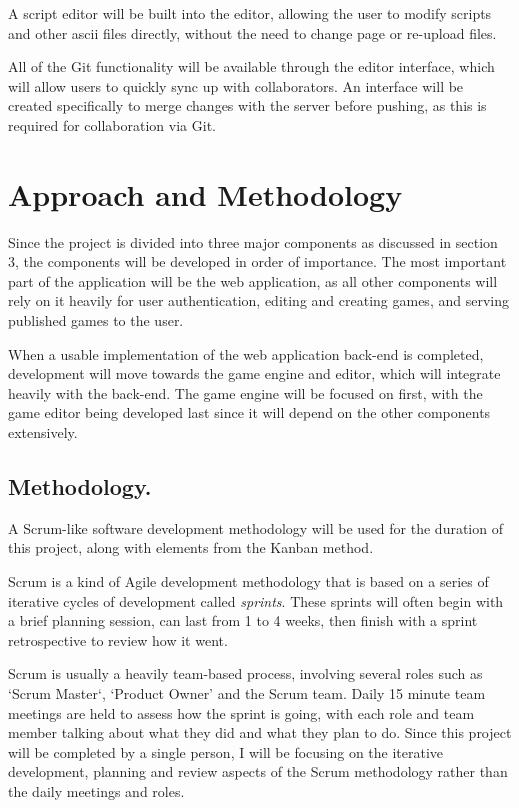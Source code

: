 \documentclass[a4paper, 12pt]{article}
\begin{document}
A script editor will be built into the editor, allowing the user to modify scripts and other ascii files directly, without the need to change page or re-upload files.

All of the Git functionality will be available through the editor interface, which will allow users to quickly sync up with collaborators. An interface will be created specifically to merge changes with the server before pushing, as this is required for collaboration via Git.

\section{Approach and Methodology}
Since the project is divided into three major components as discussed in section 3, the components will be developed in order of importance. The most important part of the application will be the web application, as all other components will rely on it heavily for user authentication, editing and creating games, and serving published games to the user.

When a usable implementation of the web application back-end is completed, development will move towards the game engine and editor, which will integrate heavily with the back-end. The game engine will be focused on first, with the game editor being developed last since it will depend on the other components extensively.

\subsection{Methodology.}
A Scrum-like software development methodology will be used for the duration of this project, along with elements from the Kanban method.

Scrum is a kind of Agile development methodology that is based on a series of iterative cycles of development called \emph{sprints}. These sprints will often begin with a brief planning session, can last from 1 to 4 weeks, then finish with a sprint retrospective to review how it went.

Scrum is usually a heavily team-based process, involving several roles such as `Scrum Master`, `Product Owner' and the Scrum team. Daily 15 minute team meetings are held to assess how the sprint is going, with each role and team member talking about what they did and what they plan to do. Since this project will be completed by a single person, I will be focusing on the iterative development, planning and review aspects of the Scrum methodology rather than the daily meetings and roles.
\end{document}
